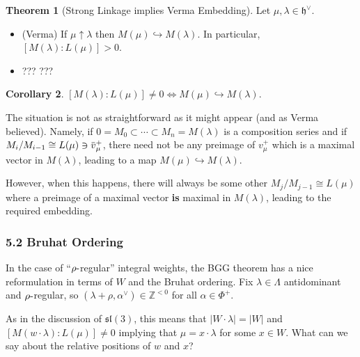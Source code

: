 \documentclass[11pt]{scrartcl}
\theoremstyle{definition}
\theoremstyle{theorem}
\newtheorem{theorem}{Theorem}[section]
\newtheorem{corollary}[theorem]{Corollary}
\theoremstyle{proof}
\theoremstyle{definition}
\theoremstyle{break}
\theoremstyle{problem}
\providecommand{\tightlist}{%
  \setlength{\itemsep}{0pt}\setlength{\parskip}{0pt}}
\newcommand{\ZZ}[0]{{\mathbb{Z}}}
\newcommand{\abs}[1]{{\left\lvert {#1} \right\rvert}}
\newcommand{\dash}[0]{{\hbox{-}}}
\newcommand{\dual}[0]{^\vee}
\newcommand{\injects}[0]{\hookrightarrow}
\newcommand{\lieh}[0]{{\mathfrak{h}}}
\newcommand{\liesl}[0]{{\mathfrak{sl}}}
\renewcommand{\bar}[1]{\mkern 1.5mu\overline{\mkern-1.5mu#1\mkern-1.5mu}\mkern 1.5mu}
\begin{document}
\begin{theorem}[Strong Linkage implies Verma Embedding]

Let \(\mu, \lambda \in \lieh\dual\).

\begin{itemize}
\tightlist
\item
  (Verma) If \(\mu\uparrow \lambda\) then
  \(M(\mu) \injects M(\lambda)\). In particular,
  \([M(\lambda): L(\mu)] > 0\).
\item
  ??? ???
\end{itemize}

\end{theorem}

\begin{corollary}

\([M(\lambda): L(\mu)] \neq 0 \iff M(\mu) \injects M(\lambda)\).\end{corollary}

The situation is not as straightforward as it might appear (and as Verma
believed). Namely, if
\(0 = M_0 \subset \cdots \subset M_n = M(\lambda)\) is a composition
series and if \(M_i / M_{i-1} \cong L(\mu) \ni \bar v_{\mu}^+\), there
need not be any preimage of \(v_\mu^+\) which is a maximal vector in
\(M(\lambda)\), leading to a map \(M(\mu) \injects M(\lambda)\).

However, when this happens, there will always be some other
\(M_j/M_{j-1} \cong L(\mu)\) where a preimage of a maximal vector
\textbf{is} maximal in \(M(\lambda)\), leading to the required
embedding.

\hypertarget{bruhat-ordering}{%
\subsubsection{5.2 Bruhat Ordering}\label{bruhat-ordering}}

In the case of ``\(\rho\dash\)regular'' integral weights, the BGG
theorem has a nice reformulation in terms of \(W\) and the Bruhat
ordering. Fix \(\lambda \in \Lambda\) antidominant and
\(\rho\dash\)regular, so \((\lambda + \rho, \alpha\dual) \in \ZZ^{< 0}\)
for all \(\alpha\in \Phi^+\).

As in the discussion of \(\liesl(3)\), this means that
\(\abs{W\cdot \lambda} = \abs{W}\) and
\([M(w\cdot \lambda) : L(\mu)] \neq 0\) implying that
\(\mu = x\cdot \lambda\) for some \(x\in W\). What can we say about the
relative positions of \(w\) and \(x\)?
\end{document}
